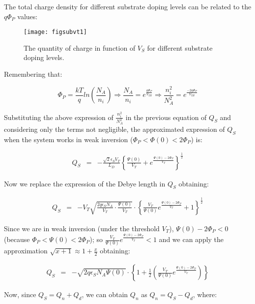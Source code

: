 \documentclass[a4paper, 12pt, twoside, openright]{report}
\begin{document}
The total charge density for different substrate doping levels can be related to the $q\Phi_P$ values:

	\begin{figure}[H]
	\centering
	\texttt{[image: figsubvt1]}
	\caption{The quantity of charge in function of $V_{S}$ for different substrate doping levels.}
	\label{}
	\end{figure}

Remembering that:

\begin{equation}
\Phi_P = \frac{kT}{q}ln\left(\frac{N_A}{n_i}\right) \Rightarrow \frac{N_A}{n_i} = e^{\frac{q \Phi_P}{V_{TH}}} \Rightarrow \frac{n_{i}^2}{N_{A}^2} = e^{\frac{-2q \Phi_P}{V_{TH}}}
\end{equation}

Substituting the above expression of $\frac{n_{i}^2}{N_{A}^2}$ in the previous equation of $Q_{S}$ and considering only the terms not negligible, the approximated expression of $Q_{S}$ when the system works in weak inversion ($\Phi_P < \Phi(0) < 2\Phi_P$) is:

   \begin{eqnarray*}
      Q_S&=&-\displaystyle\frac{\sqrt{2}\epsilon_S V_T}{L_D}
            \left\{\frac{\Psi(0)}{V_T} + 
          e^{\displaystyle \frac{\Psi(0)-2\Phi_P}{V_T}}\right\}^{\frac{1}{2}}
    \end{eqnarray*}

Now we replace the expression of the Debye length in $Q_{S}$ obtaining:

    \begin{eqnarray*}
      Q_S&=&-V_T \sqrt{\frac {2q \epsilon_S N_A}{V_T} \cdot \frac {\Psi(0)}{V_T}}\cdot \left\{ {\frac{V_T}{\Psi(0)} e^{\displaystyle \frac{\Psi(0)-2\Phi_P}{V_T}}} +1 \right\}^{\frac{1}{2}}
     \end{eqnarray*}

Since we are in weak inversion (under the threshold $V_{T}$), $\Psi(0) - 2\Phi_P < 0$ (because $\Phi_P < \Psi(0) < 2\Phi_P$); so $\frac{V_T}{\Psi(0)}e^{\frac{\Psi(0) - 2\Phi_P}{V_T}} < 1$ and we can apply the approximation $\sqrt{x+1} \approx 1+ \frac{x}{2}$ obtaining:

 \begin{eqnarray*}
      Q_S &=&-\sqrt{2q \epsilon_S N_A \Psi(0)}\cdot \left\{ 1 +\frac{1}{2}\left( \frac{V_T}{\Psi(0)} e^{\displaystyle\frac{\Psi(0)-2\Phi_P}{V_T}}\right) \right\}
  \end{eqnarray*}

Now, since $Q_S = Q_n + Q_d$, we can obtain $Q_{n}$ as $Q_n = Q_S - Q_d$, where:
\end{document}
